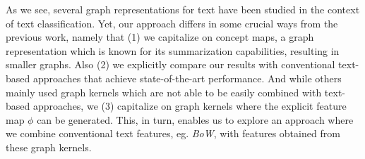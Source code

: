 As we see, several graph representations for text have been studied in the context of text classification.
Yet, our approach differs in some crucial ways from the previous work, namely that (1) we capitalize on concept maps, a graph representation which is known for its summarization capabilities, resulting in smaller graphs. Also (2) we explicitly compare our results with conventional text-based approaches that achieve state-of-the-art performance.
And while others mainly used graph kernels which are not able to be easily combined with text-based approaches, we (3) capitalize on graph kernels where the explicit feature map $\phi$ can be generated.
This, in turn, enables us to explore an approach where we combine conventional text features, eg. \textit{BoW}, with features obtained from these graph kernels.